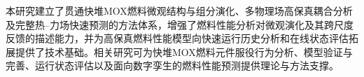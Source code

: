 \begin{chineseabstract}
本研究建立了贯通快堆MOX燃料微观结构与组分演化、多物理场高保真耦合分析及完整热--力场快速预测的方法体系，增强了燃料性能分析对微观演化及其跨尺度反馈的描述能力，并为高保真燃料性能模型向快速运行历史分析和在线状态评估拓展提供了技术基础。相关研究可为快堆MOX燃料元件服役行为分析、模型验证与完善、运行状态评估以及面向数字孪生的燃料性能预测提供理论与方法支撑。



\end{chineseabstract}

